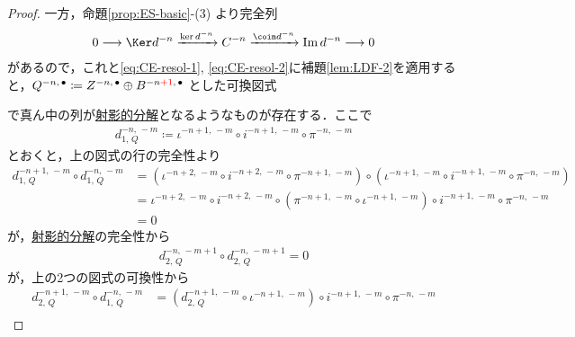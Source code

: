 \documentclass[algtopo_main]{subfiles}
\begin{document}
\begin{proof}
    一方，命題\ref{prop:ES-basic}-(3) より完全列
    \begin{align}
        0 \lto \Ker d^{-n} \xrightarrow{\ker d^{-n}} C^{-n} \xrightarrow{\coim d^{-n}} \Im d^{-n} \lto 0
    \end{align}
    があるので，これと\eqref{eq:CE-resol-1}, \eqref{eq:CE-resol-2}に補題\ref{lem:LDF-2}を適用すると，$Q^{-n,\, \bullet} \coloneqq Z^{-n,\, \bullet} \oplus B^{-n \textcolor{red}{+1},\, \bullet}$ とした可換図式
    \begin{center}
    \end{center}
    で真ん中の列が\hyperref[def:projective-resolution]{射影的分解}となるようなものが存在する．ここで
    \begin{align}
        d_{1,\, Q}^{-n,\, -m} \coloneqq \iota^{-n+1,\, -m} \circ i^{-n+1,\, -m} \circ \pi^{-n,\, -m}
    \end{align}
    とおくと，上の図式の行の完全性より
    \begin{align}
        d^{-n+1,\,-m}_{1,\,Q} \circ d^{-n,\, -m}_{1,\, Q} &= (\iota^{-n+2,\, -m} \circ i^{-n+2,\, -m} \circ \pi^{-n+1,\, -m}) \circ (\iota^{-n+1,\, -m} \circ i^{-n+1,\, -m} \circ \pi^{-n,\, -m}) \\
        &= \iota^{-n+2,\, -m} \circ i^{-n+2,\, -m} \circ (\pi^{-n+1,\, -m} \circ \iota^{-n+1,\, -m}) \circ i^{-n+1,\, -m} \circ \pi^{-n,\, -m} \\
        &= 0 \label{eq:CEresol-L-DC-1}
    \end{align}
    が，\hyperref[def:projective-resolution]{射影的分解}の完全性から
    \begin{align}
        d^{-n,\,-m+1}_{2,\,Q} \circ d^{-n,\, -m+1}_{2,\, Q} = 0 \label{eq:CEresol-L-DC-2}
    \end{align}
    が，上の2つの図式の可換性から
    \begin{align}
        d^{-n+1,\, -m}_{2,\, Q} \circ d^{-n,\, -m}_{1,\, Q} &= (d^{-n+1,\, -m}_{2,\, Q} \circ \iota^{-n+1,\, -m}) \circ i^{-n+1,\, -m} \circ \pi^{-n,\, -m} \\

\end{align}
\end{proof}
\end{document}
